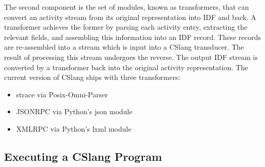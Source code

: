 The second component is the set of modules, known as transformers, that can
convert an activity stream from its original representation into IDF and
back.  A transformer achieves the former by parsing each activity entry,
extracting the relevant fields, and assembling this information into an IDF
record.  These records are re-assembled into a stream which is input into a
CSlang transducer.  The result of processing this stream undergoes the
reverse.  The output IDF stream is converted by a transformer back into the
original activity representation.  The current version of CSlang ships with
three transformers:
\begin{itemize}
\item{strace via Posix-Omni-Parser}
\item{JSONRPC via Python's json module}
\item{XMLRPC via Python's lxml module}
\end{itemize}



\subsection{Executing a CSlang Program}
%

